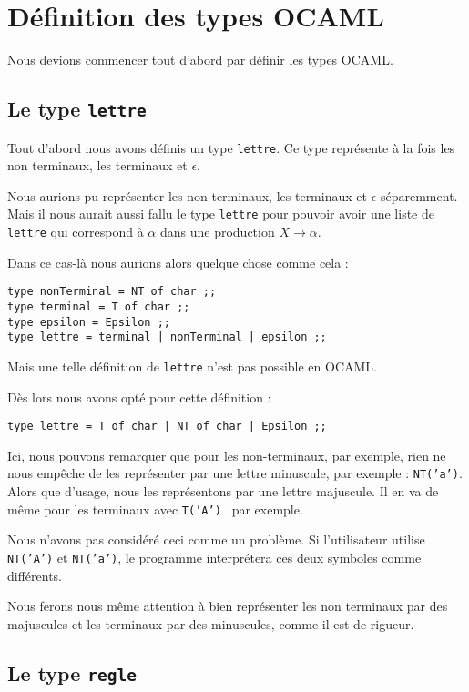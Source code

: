\documentclass[11pt,a4paper]{article}
\def\code#1{\texttt{#1}} %
\begin{document}
\section{Définition des types OCAML}

Nous devions commencer tout d'abord par définir les types OCAML.
\newline

\subsection{Le type \code{lettre}}
Tout d'abord nous avons définis un type \code{lettre}. Ce type 
représente à la fois les non terminaux, les terminaux et $\epsilon$.

Nous aurions pu représenter les non terminaux, les terminaux et
$\epsilon$ séparemment. Mais il nous aurait aussi fallu le type \code{lettre}
pour pouvoir avoir une liste de \code{lettre} qui correspond à $\alpha$
dans une production $X \rightarrow \alpha$.

Dans ce cas-là nous aurions alors quelque chose comme cela : 
\begin{verbatim}
type nonTerminal = NT of char ;;
type terminal = T of char ;;
type epsilon = Epsilon ;;
type lettre = terminal | nonTerminal | epsilon ;;
\end{verbatim}

Mais une telle définition de \code{lettre} n'est pas possible en OCAML.

Dès lors nous avons opté pour cette définition : 
\begin{verbatim}
type lettre = T of char | NT of char | Epsilon ;;
\end{verbatim}

Ici, nous pouvons remarquer que pour les non-terminaux,
par exemple, rien ne nous empêche de les représenter par
une lettre minuscule, par exemple : \code{NT('a')}.
Alors que d'usage, 
nous les représentons par une lettre majuscule. 
Il en va de même pour les terminaux avec \code{T('A') } par
exemple.

Nous n'avons pas considéré ceci comme un problème. Si
l'utilisateur utilise \code{NT('A')} et \code{NT('a')}, le
programme interprétera ces deux symboles comme différents.

Nous ferons nous même attention à bien représenter les non terminaux
par des majuscules et les terminaux par des minuscules, comme il est de rigueur.

\subsection{Le type \code{regle}}
\end{document}
